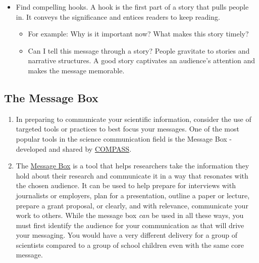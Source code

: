 \documentclass[
]{book}
\providecommand{\tightlist}{%
  \setlength{\itemsep}{0pt}\setlength{\parskip}{0pt}}
\begin{document}
\begin{enumerate}
\begin{itemize}
    \begin{itemize}
    \tightlist
    \item
      Find compelling hooks. A hook is the first part of a story that pulls people in. It conveys the significance and entices readers to keep reading.

      \begin{itemize}
      \tightlist
      \item
        For example: Why is it important now? What makes this story timely?
      \item
        Can I tell this message through a story? People gravitate to stories and narrative structures. A good story captivates an audience's attention and makes the message memorable.
      \end{itemize}
    \end{itemize}
  \end{itemize}
\end{enumerate}

\hypertarget{the-message-box}{%
\subsection{The Message Box}\label{the-message-box}}

\begin{enumerate}
\def\labelenumi{\arabic{enumi}.}
\item
  In preparing to communicate your scientific information, consider the use of targeted tools or practices to best focus your messages. One of the most popular tools in the science communication field is the Message Box - developed and shared by \href{https://www.compassscicomm.org/about-us/}{COMPASS}.
\item
  The \href{https://www.compassscicomm.org/leadership-development/the-message-box/}{Message Box} is a tool that helps researchers take the information they hold about their research and communicate it in a way that resonates with the chosen audience. It can be used to help prepare for interviews with journalists or employers, plan for a presentation, outline a paper or lecture, prepare a grant proposal, or clearly, and with relevance, communicate your work to others. While the message box \emph{can} be used in all these ways, you must first identify the audience for your communication as that will drive your messaging. You would have a very different delivery for a group of scientists compared to a group of school children even with the same core message.
\end{enumerate}
\end{document}
